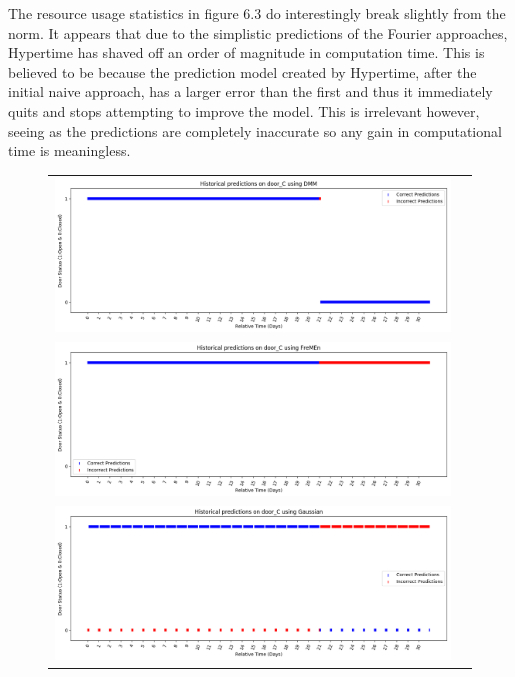 The resource usage statistics in figure 6.3 do interestingly break slightly
from the norm. It appears that due to the simplistic predictions of the
Fourier approaches, Hypertime has shaved off an order of magnitude in
computation time. This is believed to be because the prediction model created
by Hypertime, after the initial naive approach, has a larger error than the first and thus it immediately quits
and stops attempting to improve the model. This is irrelevant however, seeing
as the predictions are completely inaccurate so any gain in computational time
is meaningless.

\begin{center}
\begin{figure}[!Hp]
  \begin{tabular}{cc}
    {\includegraphics[width = 6in]{images/results/Historical_door_C_DMM.png}} \\
    {\includegraphics[width = 6in]{images/results/Historical_door_C_FreMEn.png}} \\
    {\includegraphics[width = 6in]{images/results/Historical_door_C_Gaussian.png}} \\

\end{tabular}
\end{figure}
\end{center}
